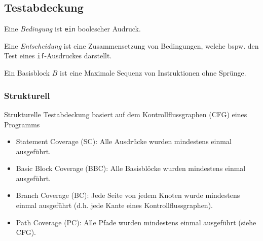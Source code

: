 \documentclass[
    ngerman,
    color=3b,
    summary,
    boxarc,
    main,
]{rubos-tuda-template}
\begin{document}
\subsection{Testabdeckung}
\begin{definition}[Bedingung]
    Eine \textit{Bedingung} ist \texttt{ein} boolescher Audruck.
\end{definition}
\begin{definition}[Entscheidung]
    Eine \textit{Entscheidung} ist eine Zusammensetzung von Bedingungen, welche bspw. den Test eines \texttt{if}-Ausdruckes darstellt.
\end{definition}
\begin{definition}
    Ein Basisblock $B$ ist eine Maximale Sequenz von Instruktionen ohne Sprünge.
\end{definition}
\subsubsection{Strukturell}
Strukturelle Testabdeckung basiert auf dem Kontrollflussgraphen (CFG) eines Programms\begin{itemize}
    \item Statement Coverage (SC): Alle Ausdrücke wurden mindestens einmal ausgeführt.
    \item Basic Block Coverage (BBC): Alle Basisblöcke wurden mindestens einmal ausgeführt.
    \item Branch Coverage (BC): Jede Seite von jedem Knoten wurde mindestens einmal ausgeführt (d.h. jede Kante eines Kontrollflussgraphen).
    \item Path Coverage (PC): Alle Pfade wurden mindestens einmal ausgeführt (siehe CFG).
\end{itemize}
\end{document}
